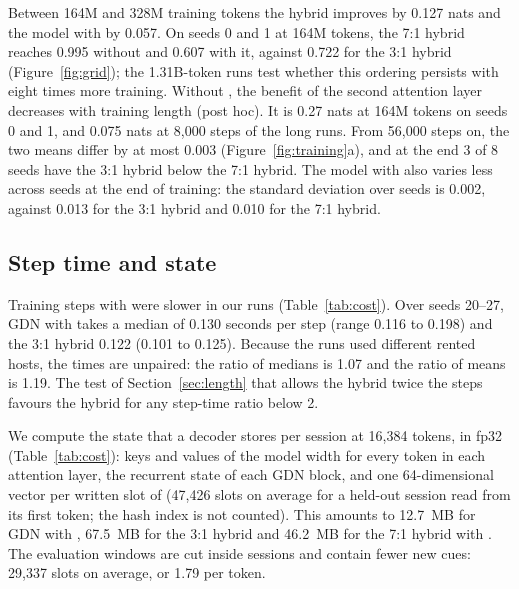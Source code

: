 Between 164M and 328M training tokens the hybrid improves by 0.127 nats and the model with
\ingram{} by 0.057. On seeds 0 and 1 at 164M tokens, the 7:1 hybrid reaches 0.995 without
\ingram{} and 0.607 with it, against 0.722 for the 3:1 hybrid (Figure~\ref{fig:grid}); the
1.31B-token runs test whether this ordering persists with eight times more training. Without
\ingram{}, the benefit of the second attention layer decreases with training length (post hoc). It
is 0.27 nats at 164M tokens on seeds 0 and 1, and 0.075 nats at 8,000 steps of the long runs. From
56,000 steps on, the two means differ by at most 0.003 (Figure~\ref{fig:training}a), and at the
end 3 of 8 seeds have the 3:1 hybrid below the 7:1 hybrid. The model with \ingram{} also varies
less across seeds at the end of training: the standard deviation over seeds is 0.002, against
0.013 for the 3:1 hybrid and 0.010 for the 7:1 hybrid.

\subsection{Step time and state}
\label{sec:cost}

\begin{table}[!htb]
\centering
\footnotesize

\caption{Cost of the models in Table~\ref{tab:confirm}. Seconds per step are wall-clock time per
training step, including data loading and the periodic evaluations, over seeds 20--27; at each
evaluation a model with \ingram{} runs three additional passes with its reads ablated, which are
included. Each run used one rented RTX~4090, and hosts differ between runs. State is the fp32 size of what a decoder
stores per session after 16,384 tokens, computed as described in Appendix~\ref{sec:cost};
Figure~\ref{fig:state} extends it to longer contexts.}
\label{tab:cost}
\end{table}

Training steps with \ingram{} were slower in our runs (Table~\ref{tab:cost}). Over seeds 20--27,
GDN with \ingram{} takes a median of 0.130 seconds per step (range 0.116 to 0.198) and the 3:1
hybrid 0.122 (0.101 to 0.125). Because the runs used different rented hosts, the times are
unpaired: the ratio of medians is 1.07 and the ratio of means is 1.19. The test of
Section~\ref{sec:length} that allows the hybrid twice the steps favours the hybrid for any
step-time ratio below 2.

We compute the state that a decoder stores per session at 16,384 tokens, in fp32
(Table~\ref{tab:cost}): keys and values of the model width for every token in each attention
layer, the recurrent state of each GDN block, and one 64-dimensional vector per written slot of
\ingram{} (47,426 slots on average for a held-out session read from its first token; the hash
index is not counted). This amounts to 12.7~MB for GDN with \ingram{}, 67.5~MB for the 3:1 hybrid
and 46.2~MB for the 7:1 hybrid with \ingram{}. The evaluation windows are cut inside sessions and
contain fewer new cues: 29,337 slots on average, or 1.79 per token.

